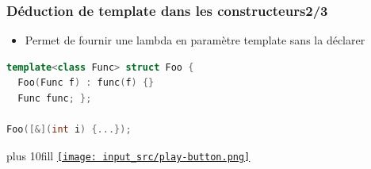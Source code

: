 \documentclass[C++.tex]{subfiles}
\begin{document}
\begin{frame}[fragile]
	\frametitle{Déduction de template dans les constructeurs\titlehfill{}2/3}
	\begin{itemize}
		\item Permet de fournir une lambda en paramètre template sans la déclarer
	\end{itemize}

	\begin{lstlisting}[language=C++]
template<class Func> struct Foo { 
  Foo(Func f) : func(f) {} 
  Func func; };

Foo([&](int i) {...});\end{lstlisting}

	\vskip 10mm plus 10fill
	\hfill
	\href{https://godbolt.org/#g:!((g:!((g:!((h:codeEditor,i:(filename:'1',fontScale:14,fontUsePx:'0',j:1,lang:c%2B%2B,selection:(endColumn:1,endLineNumber:34,positionColumn:1,positionLineNumber:34,selectionStartColumn:1,selectionStartLineNumber:34,startColumn:1,startLineNumber:34),source:'%23include+%3Ciostream%3E%0A%23include+%3Ctuple%3E%0A%23include+%3Cutility%3E%0A%0Atemplate%3Cclass+Func%3E+struct+Foo%0A%7B%0A++Foo(Func+f)+:+func(f)%0A++%7B%0A++%7D%0A%0A++void+operator()+(int+i)%0A++%7B%0A++++func(i)%3B%0A++%7D%0A%0A++Func+func%3B%0A%7D%3B%0A%0Aint+main()%0A%7B%0A++%7B%0A++++std::pair+p(2,+4.5)%3B%0A++++std::tuple+t(4,+3,+2.5)%3B%0A++%7D%0A%0A++%7B%0A++++int+a+%3D+2%3B%0A%0A++++Foo+foo(%5B%26%5D(int+i)+%7Bstd::cout+%3C%3C+a+*+i+%3C%3C+!'%5Cn!'%3B%7D)%3B%0A%0A++++foo(5)%3B%0A++%7D%0A%7D%0A'),l:'5',n:'0',o:'C%2B%2B+source+%231',t:'0')),k:50,l:'4',n:'0',o:'',s:0,t:'0'),(g:!((h:executor,i:(argsPanelShown:'1',compilationPanelShown:'0',compiler:g112,compilerOutShown:'0',execArgs:'',execStdin:'',fontScale:14,fontUsePx:'0',j:1,lang:c%2B%2B,libs:!((name:boost,ver:'175')),options:'-std%3Dc%2B%2B17',source:1,stdinPanelShown:'1',tree:'1',wrap:'0'),l:'5',n:'0',o:'Executor+x86-64+gcc+11.2+(C%2B%2B,+Editor+%231)',t:'0')),header:(),k:50,l:'4',n:'0',o:'',s:0,t:'0')),l:'2',n:'0',o:'',t:'0')),version:4}{\texttt{[image: input\_src/play-button.png]}}
\end{frame}
\end{document}
